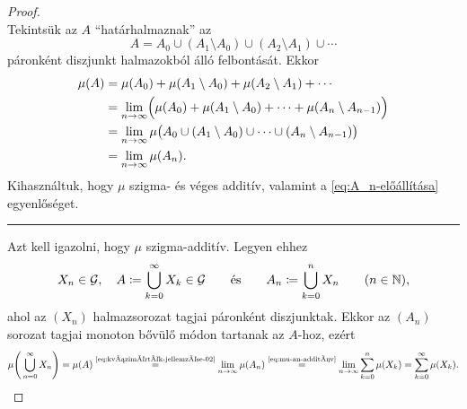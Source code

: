 \documentclass[
]{elteikthesis}[2024/04/26]
\begin{document}
	\begin{proof}\,\\[6pt]
		\fbox{\ref{eq:kvázimérték-jellemzése-01} \( \Longrightarrow \)
			  \ref{eq:kvázimérték-jellemzése-02}}
		Tekintsük az \( A \) ``határhalmaznak'' az
		\[
			A = A_0 \cup (A_1 \setminus A_0) \cup (A_2 \setminus A_1) \cup \cdots
		\]
		páronként diszjunkt halmazokból álló felbontását. Ekkor
		\begin{align*}
			\mu(A)
			&= \mu(A_0) + \mu(A_1 \setminus A_0) + \mu(A_2 \setminus A_1) + \cdots \\
			&= \lim_{n \to \infty} \Bigl( 
			\mu(A_0) + \mu(A_1 \setminus A_0) + \cdots + \mu(A_n \setminus A_{n-1})
			\Bigr)\\
			&= \lim_{n \to \infty} \mu \bigl( 
			A_0 \cup (A_1 \setminus A_0) \cup \cdots \cup (A_n \setminus A_{n-1})
			\bigr) \\
			&= \lim_{n \to \infty} \mu (A_n).
		\end{align*}
		Kihasználtuk, hogy \( \mu \) szigma- és véges additív, 
		valamint a \eqref{eq:A_n-előállítása} egyenlőséget.
		
		\vspace{9pt}
		\hrule
		\vspace{9pt}
		
		\fbox{\ref{eq:kvázimérték-jellemzése-02} \( \Longrightarrow \)
			  \ref{eq:kvázimérték-jellemzése-01}}
		Azt kell igazolni, hogy \( \mu \) szigma-additív. Legyen ehhez
		\[
			X_n \in \mathcal{G}, \quad
			A \coloneq \bigcup_{k=0}^{\infty} X_k \in \mathcal{G} \qquad \text{és} \qquad
			A_n \coloneq \bigcup_{k=0}^{n} X_n \qquad (n \in \mathbb{N}),
		\]
		ahol az \( (X_n) \) halmazsorozat tagjai páronként diszjunktak. 
		Ekkor az \( (A_n) \) sorozat tagjai monoton bővülő módon tartanak az \( A \)-hoz,
		ezért
		\[
			\mu \Biggl( \, \bigcup_{n=0}^{\infty} X_n \Biggr) =
			\mu (A) \overset{\text{\ref{eq:kvázimérték-jellemzése-02}}}{=}
			\lim_{n \to \infty} \mu( A_n ) \overset{\text{\ref{eq:mu-an-additív}}}{=}
			\lim_{n \to \infty} \sum_{k=0}^{n} \mu( X_k ) =
			\sum_{k=0}^{\infty} \mu( X_k ).
		\]
		

\end{proof}
\end{document}
